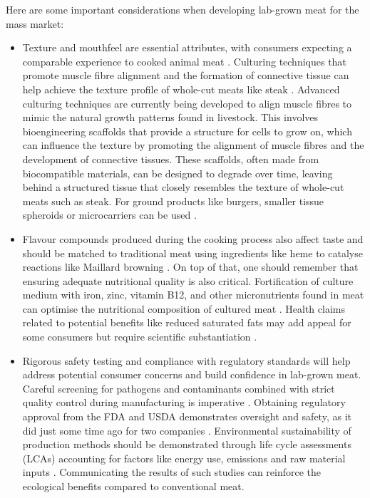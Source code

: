 \documentclass[10pt]{article}
\begin{document}
\begin{sloppypar}
  Here are some important considerations when developing lab-grown meat for the mass market:

  \begin{itemize}
    \item Texture and mouthfeel are essential attributes, with consumers expecting a comparable experience to cooked animal meat \citep{datar_possibilities_2010}. Culturing techniques that promote muscle fibre alignment and the formation of connective tissue can help achieve the texture profile of whole-cut meats like steak \citep{post_cultured_2012}. Advanced culturing techniques are currently being developed to align muscle fibres to mimic the natural growth patterns found in livestock. This involves bioengineering scaffolds that provide a structure for cells to grow on, which can influence the texture by promoting the alignment of muscle fibres and the development of connective tissues. These scaffolds, often made from biocompatible materials, can be designed to degrade over time, leaving behind a structured tissue that closely resembles the texture of whole-cut meats such as steak. For ground products like burgers, smaller tissue spheroids or microcarriers can be used \citep{specht_opportunities_2018}.


    \item Flavour compounds produced during the cooking process also affect taste and should be matched to traditional meat using ingredients like heme to catalyse reactions like Maillard browning \citep{post_cultured_2012}. On top of that, one should remember that ensuring adequate nutritional quality is also critical. Fortification of culture medium with iron, zinc, vitamin B12, and other micronutrients found in meat can optimise the nutritional composition of cultured meat \citep{fraeye_sensorial_2020}. Health claims related to potential benefits like reduced saturated fats may add appeal for some consumers but require scientific substantiation \citep{sergelidis_lab_2019}.

    \item Rigorous safety testing and compliance with regulatory standards will help address potential consumer concerns and build confidence in lab-grown meat. Careful screening for pathogens and contaminants combined with strict quality control during manufacturing is imperative \citep{ong_food_2021}. Obtaining regulatory approval from the FDA and USDA demonstrates oversight and safety, as it did just some time ago for two companies \citep{mccarthy_usda_nodate}. Environmental sustainability of production methods should be demonstrated through life cycle assessments (LCAs) accounting for factors like energy use, emissions and raw material inputs \citep{mattick_anticipatory_2015}. Communicating the results of such studies can reinforce the ecological benefits compared to conventional meat.


\end{itemize}
\end{sloppypar}
\end{document}
